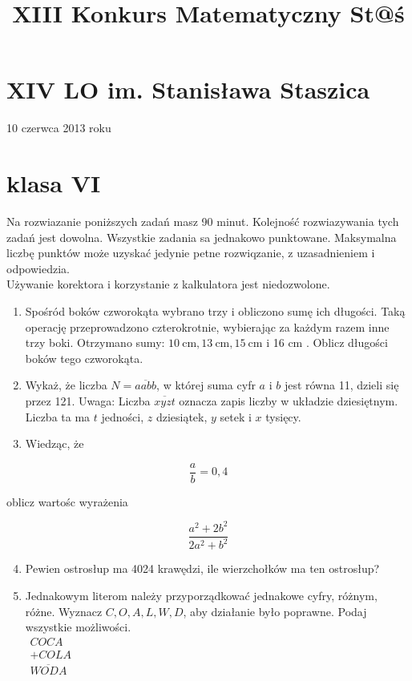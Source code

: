 \documentclass[10pt]{article}
\title{XIII Konkurs Matematyczny St@ś }
\author{}
\date{}
\begin{document}
\maketitle
\section*{XIV LO im. Stanisława Staszica}
10 czerwca 2013 roku

\section*{klasa VI}
Na rozwiazanie poniższych zadań masz 90 minut. Kolejność rozwiazywania tych zadań jest dowolna. Wszystkie zadania sa jednakowo punktowane. Maksymalna liczbę punktów może uzyskać jedynie petne rozwiqzanie, z uzasadnieniem i odpowiedzia.\\
Używanie korektora i korzystanie z kalkulatora jest niedozwolone.

\begin{enumerate}
  \item Spośród boków czworokąta wybrano trzy i obliczono sumę ich długości. Taką operację przeprowadzono czterokrotnie, wybierając za każdym razem inne trzy boki. Otrzymano sumy: \(10 \mathrm{~cm}, 13 \mathrm{~cm}, 15 \mathrm{~cm}\) i 16 cm . Oblicz długości boków tego czworokąta.
  \item Wykaż, że liczba \(N=\overline{a a b b}\), w której suma cyfr \(a\) i \(b\) jest równa 11, dzieli się przez 121. Uwaga: Liczba \(\overline{x y z t}\) oznacza zapis liczby w układzie dziesiętnym. Liczba ta ma \(t\) jedności, \(z\) dziesiątek, \(y\) setek i \(x\) tysięcy.
  \item Wiedząc, że
\end{enumerate}

\[
\frac{a}{b}=0,4
\]

oblicz wartośc wyrażenia

\[
\frac{a^{2}+2 b^{2}}{2 a^{2}+b^{2}}
\]

\begin{enumerate}
  \setcounter{enumi}{3}
  \item Pewien ostrosłup ma 4024 krawędzi, ile wierzchołków ma ten ostrosłup?
  \item Jednakowym literom należy przyporządkować jednakowe cyfry, różnym, różne. Wyznacz \(C, O, A, L, W, D\), aby działanie było poprawne. Podaj wszystkie możliwości.\\
\(\begin{array}{r}C O C A \\ +C O L A \\ \hline \overline{W O D A}\end{array}\)
\end{enumerate}
\end{document}

